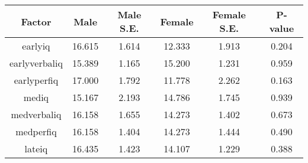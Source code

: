 \begin{longtable}{c c c c c c}
\toprule
\textbf{Factor} & \textbf{Male} & \textbf{Male S.E.}  & \textbf{Female} & \textbf{Female S.E.} & \textbf{P-value} \\
\midrule
earlyiq & 16.615 & 1.614 &  12.333 & 1.913 & 0.204 \\
earlyverbaliq & 15.389 & 1.165 &  15.200 & 1.231 & 0.959 \\
earlyperfiq & 17.000 & 1.792 &  11.778 & 2.262 & 0.163 \\
mediq & 15.167 & 2.193 &  14.786 & 1.745 & 0.939 \\
medverbaliq & 16.158 & 1.655 &  14.273 & 1.402 & 0.673 \\
medperfiq & 16.158 & 1.404 &  14.273 & 1.444 & 0.490 \\
lateiq & 16.435 & 1.423 &  14.107 & 1.229 & 0.388 \\
\bottomrule
\end{longtable}
